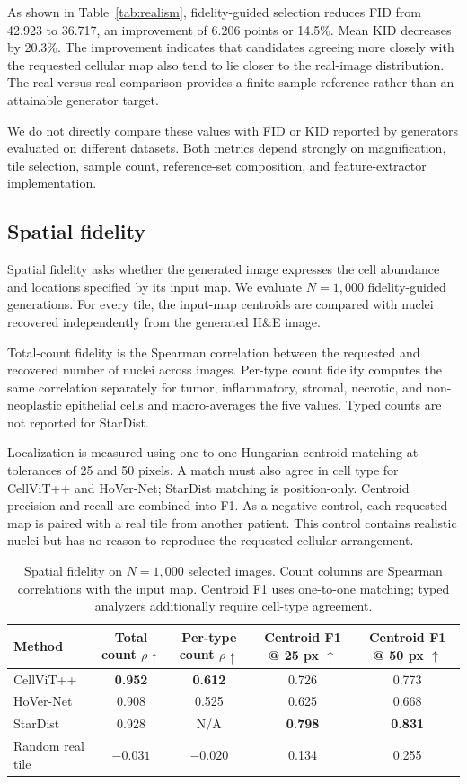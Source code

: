 As shown in Table~\ref{tab:realism}, fidelity-guided selection reduces FID from 42.923 to 36.717, an improvement of 6.206 points or 14.5\%. Mean KID decreases by 20.3\%. The improvement indicates that candidates agreeing more closely with the requested cellular map also tend to lie closer to the real-image distribution. The real-versus-real comparison provides a finite-sample reference rather than an attainable generator target.

We do not directly compare these values with FID or KID reported by generators evaluated on different datasets. Both metrics depend strongly on magnification, tile selection, sample count, reference-set composition, and feature-extractor implementation.

\subsection{Spatial fidelity}
\label{sec:spatial-fidelity-experiment}

Spatial fidelity asks whether the generated image expresses the cell abundance and locations specified by its input map. We evaluate $N=1{,}000$ fidelity-guided generations. For every tile, the input-map centroids are compared with nuclei recovered independently from the generated H\&E image.

Total-count fidelity is the Spearman correlation between the requested and recovered number of nuclei across images. Per-type count fidelity computes the same correlation separately for tumor, inflammatory, stromal, necrotic, and non-neoplastic epithelial cells and macro-averages the five values. Typed counts are not reported for StarDist.

Localization is measured using one-to-one Hungarian centroid matching at tolerances of 25 and 50 pixels. A match must also agree in cell type for CellViT++ and HoVer-Net; StarDist matching is position-only. Centroid precision and recall are combined into F1. As a negative control, each requested map is paired with a real tile from another patient. This control contains realistic nuclei but has no reason to reproduce the requested cellular arrangement.

\begin{table}[t]
\centering
\caption{Spatial fidelity on $N=1{,}000$ selected images. Count columns are Spearman correlations with the input map. Centroid F1 uses one-to-one matching; typed analyzers additionally require cell-type agreement.}
\label{tab:spatial}
\setlength{\tabcolsep}{7pt}
\begin{tabular}{lcccc}
\toprule
Method
& Total count $\rho\uparrow$
& Per-type count $\rho\uparrow$
& Centroid F1 @ 25 px $\uparrow$
& Centroid F1 @ 50 px $\uparrow$ \\
\midrule
CellViT++
& \textbf{0.952}
& \textbf{0.612}
& 0.726
& 0.773 \\
HoVer-Net
& 0.908
& 0.525
& 0.625
& 0.668 \\
StarDist
& 0.928
& N/A
& \textbf{0.798}
& \textbf{0.831} \\
Random real tile
& $-0.031$
& $-0.020$
& 0.134
& 0.255 \\
\bottomrule
\end{tabular}
\end{table}

